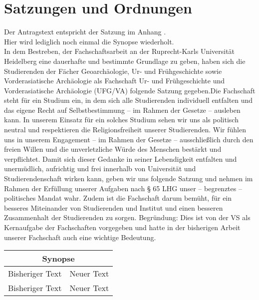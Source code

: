 \section{Satzungen und Ordnungen}

{   
    Der Antragstext entspricht der Satzung im Anhang .\\
    Hier wird lediglich noch einmal die Synopse wiederholt.\\[1.5em]

    In dem Bestreben, der Fachschaftsarbeit an der Ruprecht-Karls Universität Heidelberg
    eine dauerhafte und bestimmte Grundlage zu geben, haben sich die Studierenden der
    Fächer Geoarchäologie, Ur- und Frühgeschichte sowie Vorderasiatische Archäologie als
    Fachschaft Ur- und Frühgeschichte und Vorderasiatische Archäologie (UFG/VA) folgende
    Satzung gegeben.\newline Die Fachschaft steht für ein Studium ein, in dem sich alle Studierenden individuell
    entfalten und das eigene Recht auf Selbstbestimmung – im Rahmen der Gesetze –
    ausleben kann. In unserem Einsatz für ein solches Studium sehen wir uns als politisch
    neutral und respektieren die Religionsfreiheit unserer Studierenden. Wir fühlen uns
    in unserem Engagement – im Rahmen der Gesetze – ausschließlich durch den freien
    Willen und die unverletzliche Würde des Menschen bestärkt und verpflichtet. Damit
    sich dieser Gedanke in seiner Lebendigkeit entfalten und unermüdlich, aufrichtig und
    frei innerhalb von Universität und Studierendenschaft wirken kann, geben wir uns
    folgende Satzung und nehmen im Rahmen der Erfüllung unserer Aufgaben nach § 65 LHG
    unser – begrenztes – politisches Mandat wahr. Zudem ist die Fachschaft darum bemüht,
    für ein besseres Miteinander von Studierenden und Institut und einen besseren
    Zusammenhalt der Studierenden zu sorgen. Begründung: Dies ist von der VS als
    Kernaufgabe der Fachschaften vorgegeben und hatte in der bisherigen Arbeit unserer
    Fachschaft auch eine wichtige Bedeutung.
    \begin{longtable}{|p{7.5cm}|p{7.5cm}|}
        \hline
        \multicolumn{2}{|c|}{Synopse}\\\hline
        Bisheriger Text & Neuer Text \\\hline
        \endfirsthead
        \hline
        Bisheriger Text & Neuer Text \\

\end{longtable}}
